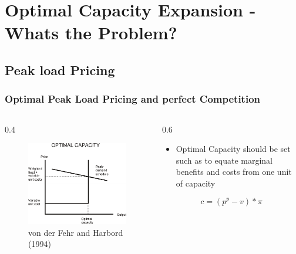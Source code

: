 \section{Optimal Capacity Expansion - Whats the Problem?}

\subsection{Peak load Pricing}

					\begin{frame}
					
\frametitle{Optimal Peak Load Pricing and perfect Competition}
\begin{columns}
\begin{column} {0.4\textwidth}

\begin{figure}[h]
\centering
\includegraphics[width=1.\textwidth]{capacity/peak_load_opt}
    \caption{von der Fehr and Harbord (1994)}
    \label{fig:Daten 2004}            
\end{figure}
\end{column}

\begin{column} {0.6\textwidth}
\begin{itemize}
\item Optimal Capacity should be set such as to equate marginal benefits and costs from one unit of capacity
\end{itemize}

\begin{equation}
	c=(p^p-v)*\pi
\end{equation}


\end{column}
\end{columns}
\end{frame}
